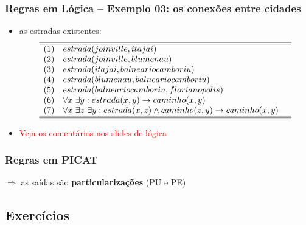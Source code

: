\documentclass[10pt]{beamer}
\begin{document}
\begin{frame}
    \frametitle{Regras  em Lógica -- Exemplo 03: os conexões entre cidades}
    \begin{itemize}
    \item as estradas existentes:
  $$\begin{array}{lll} \hline\hline
	(1) & estrada(joinville, itajai) & \\
	(2) & estrada(joinville, blumenau) & \\
	(3) & estrada(itajai, balneariocamboriu) & \\
	(4) & estrada(blumenau, balneariocamboriu) & \\
	(5) & estrada(balneariocamboriu, florianopolis) & \\
	(6) & \forall x ~\exists y: estrada(x, y) \rightarrow caminho(x, y) & \\
	(7) & \forall x ~\exists z ~\exists y: estrada(x, z) \wedge caminho(z, y) \rightarrow caminho (x,y) &\\
	\hline\hline
	\end{array}$$	

    \item \textcolor{red}{Veja os comentários nos slides de lógica}
    \end{itemize}
\end{frame}



\begin{frame}[allowframebreaks=0.9]
 \frametitle{Regras em PICAT}


   $\Rightarrow $ as saídas são \textbf{particularizações} (PU e PE)
 
\end{frame}



\subsection{Exercícios}
\end{document}
